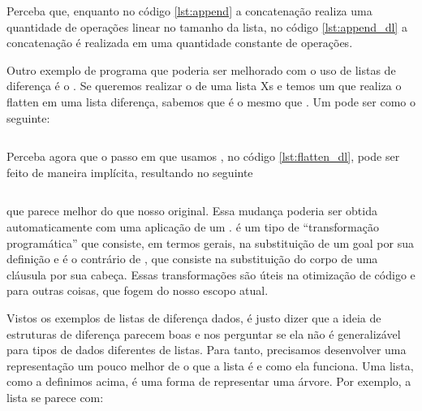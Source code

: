     \begin{listing}
\inputminted{prolog}{../Exemplos/Cap3/prog5_concatenate_diff.pl}\label{lst:append_dl}
    \end{listing}
    \begin{listing}
\inputminted{prolog}{../Exemplos/Cap3/prog3_flatten.pl}\label{lst:flatten}
    \end{listing}

Perceba que, enquanto no código \ref{lst:append} a concatenação realiza uma quantidade de operações linear no tamanho da lista,
no código \ref{lst:append_dl} a concatenação é realizada em uma quantidade constante de operações.

Outro exemplo de programa que poderia ser melhorado com o uso de listas de diferença é o
. Se queremos realizar o  de uma lista Xs e temos um
 que realiza o flatten em uma lista diferença, sabemos que
 é o mesmo que . Um
 pode ser como o seguinte:

    \begin{listing}
\inputminted{prolog}{../Exemplos/Cap3/prog_flatten_dl1.pl}\label{lst:flatten_dl}
    \end{listing}

Perceba agora que o passo em que usamos , no código \ref{lst:flatten_dl}, pode ser feito de maneira implícita, resultando no seguinte

    \begin{listing}
\inputminted{prolog}{../Exemplos/Cap3/prog_flatten_dl2.pl}\label{lst:flatten_dl2}
    \end{listing}

\noindent que parece melhor do que nosso  original. Essa mudança poderia ser obtida automaticamente com uma aplicação de um .
 é um tipo de ``transformação programática'' que consiste, em termos gerais, na substituição de um goal por
sua definição e é o contrário de , que consiste na substituição do corpo de uma cláusula por sua cabeça. Essas
transformações são úteis na otimização de código e para outras coisas, que fogem do nosso escopo atual.

Vistos os exemplos de listas de diferença dados, é justo dizer que a ideia de estruturas de diferença parecem boas e nos perguntar se ela não é generalizável
para tipos de dados diferentes de listas. Para tanto, precisamos desenvolver uma representação um pouco melhor de o que a lista é
e como ela funciona. Uma lista, como a definimos acima, é uma forma de representar uma árvore. Por exemplo, a lista \codigo{[a,b,c]} se parece com:

